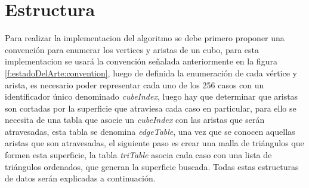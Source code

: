 \section{Estructura}
\label{ch:implementacion:sec:estructura}

Para realizar la implementacion del algoritmo se debe primero proponer una convención para enumerar los vertices y aristas de un cubo, para esta implementacion se usará la convención señalada anteriormente en la figura \ref{f:estadoDelArte:convention}, luego de definida la enumeración de cada vértice y arista, es necesario poder representar cada uno de los 256 casos con un identificador único denominado \emph{cubeIndex}, luego hay que determinar que aristas son cortadas por la superficie que atraviesa cada caso en particular, para ello se necesita de una tabla que asocie un \emph{cubeIndex} con las aristas que serán atravesadas, esta tabla se denomina \emph{edgeTable}, una vez que se conocen aquellas aristas que son atravesadas, el siguiente paso es crear una malla de triángulos que formen esta superficie, la tabla \emph{triTable} asocia cada caso con una lista de triángulos ordenados, que generan la superficie buscada. Todas estas estructuras de datos serán explicadas a continuación.